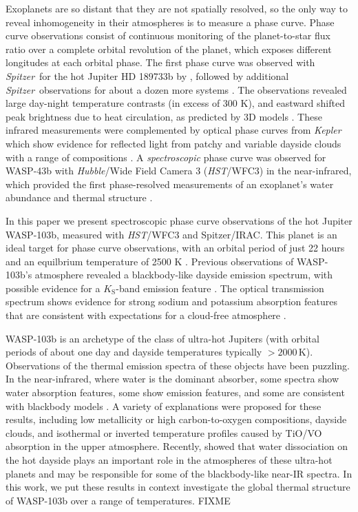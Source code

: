 \documentclass[twocolumn]{aastex61}
\newcommand{\project}[1]{\textsl{#1}}
\newcommand{\HST}{\project{HST}}
\newcommand{\Spitzer}{\project{Spitzer}}
\newcommand{\Kepler}{\project{Kepler}}
\begin{document}
Exoplanets are so distant that they are not spatially resolved, so the only way to reveal inhomogeneity in their atmospheres is to measure a phase curve. Phase curve observations consist of continuous monitoring of the planet-to-star flux ratio over a complete orbital revolution of the planet, which exposes different longitudes at each orbital phase.  The first phase curve was observed with \Spitzer\ for the hot Jupiter HD 189733b by \citep{knutson07}, followed by additional \Spitzer\ observations for about a dozen more systems \citep[cataloged in][]{parmentier17}.  The observations revealed large day-night temperature contrasts (in excess of 300 K), and eastward shifted peak brightness due to heat circulation, as predicted by 3D models \citep{showman09}.  These infrared measurements were complemented by optical phase curves from \Kepler\, which show evidence for reflected light from patchy and variable dayside clouds with a range of compositions \citep{demory13, hu15, armstrong16, parmentier16}. A \emph{spectroscopic} phase curve was observed for WASP-43b with \emph{Hubble}/Wide Field Camera 3 (\HST/WFC3) in the near-infrared, which provided the first phase-resolved measurements of an exoplanet's water abundance and thermal structure \citep{stevenson14, stevenson17}.

In this paper we present spectroscopic phase curve observations of the hot Jupiter WASP-103b, measured with \HST/WFC3 and Spitzer/IRAC. This planet is an ideal target for phase curve observations, with an orbital period of just 22 hours and an equilbrium temperature of 2500 K \citep{gillon14}.  Previous observations of WASP-103b's atmosphere revealed a blackbody-like dayside emission spectrum, with possible evidence for a $K_\mathrm{S}$-band emission feature \citep{cartier17, delrez18}. The optical transmission spectrum shows evidence for strong sodium and potassium absorption features that are consistent with expectations for a cloud-free atmosphere \citep{lendl17}.%


WASP-103b is an archetype of the class of ultra-hot Jupiters (with orbital periods of about one day and dayside temperatures typically $>2000\,\mathrm{K}$). Observations of the thermal emission spectra of these objects have been puzzling. In the near-infrared, where water is the dominant absorber, some spectra show water absorption features, some show emission features, and some are consistent with blackbody models \citep{madhusudhan11, crossfield12, stevenson14b, haynes15, evans16, beatty17a, beatty17b, sheppard17, arcangeli18, mansfield18}.  A variety of explanations were proposed for these results, including low metallicity or high carbon-to-oxygen compositions, dayside clouds, and isothermal or inverted temperature profiles caused by TiO/VO absorption in the upper atmosphere. Recently, \cite{arcangeli18} showed that water dissociation on the hot dayside plays an important role in the atmospheres of these ultra-hot planets and may be responsible for some of the blackbody-like near-IR spectra. In this work, we put these results in context investigate the global thermal structure of WASP-103b over a range of temperatures. FIXME
\end{document}
